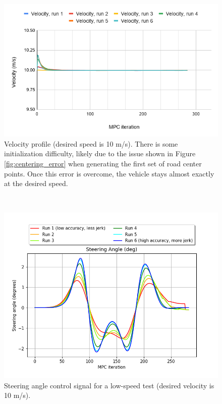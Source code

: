 \documentclass[conference]{IEEEtran}
\begin{document}

\begin{figure}[tbp]
\includegraphics[width=1.0\linewidth]{velocity.png}
\caption{Velocity profile (desired speed is 10 m/s). There is some initialization difficulty, likely due to the issue shown in Figure \ref{fig:centering_error}  when  generating the first set of road center points. Once this error is overcome, the vehicle stays almost exactly at the desired speed.}
\label{fig:velocity_low}
\end{figure}\

\begin{figure}[tbp]
	\includegraphics[width=1.0\linewidth]{steering_angle.png}
	\caption{Steering angle control signal for a low-speed test (desired velocity is 10 m/s).}
	\label{fig:steering_low}
\end{figure}
\end{document}
